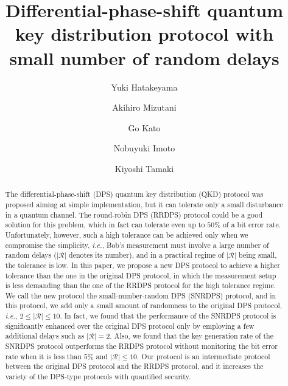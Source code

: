 \documentclass[twocolumn,superscriptaddress,pra,footinbib,notitlepage]{revtex4-1}
\newcommand{\1}{\mbox{1}\hspace{-0.25em}\mbox{l}}
\newcommand{\abs}[1]{\lvert#1\rvert}
\begin{document}
\title{
Differential-phase-shift quantum key distribution protocol with small number of random delays
}
\author{Yuki Hatakeyama}
\author{Akihiro Mizutani}
\author{Go Kato}
\author{Nobuyuki Imoto}
\author{Kiyoshi Tamaki}
\begin{abstract}

The differential-phase-shift (DPS) quantum key distribution (QKD) protocol was proposed aiming at simple implementation, but it can tolerate only a small disturbance in a quantum channel.
The round-robin DPS (RRDPS) protocol could be a good solution for this problem, which in fact can tolerate even up to $50\%$ of a bit error rate.
Unfortunately, however, such a high tolerance can be achieved only when we compromise the simplicity, \textit{i.e.}, Bob's measurement must involve a large number of random delays ($\abs{\mathcal{R}}$ denotes its number), and in a practical regime of $\abs{\mathcal{R}}$ being small, the tolerance is low.
In this paper, we propose a new DPS protocol to achieve a higher tolerance than the one in the original DPS protocol, in which the measurement setup is less demanding than the one of the RRDPS protocol for the high tolerance regime.
We call the new protocol the small-number-random DPS (SNRDPS) protocol, and in this protocol, we add only a small amount of randomness to the original DPS protocol, \textit{i.e.}, $2\leq\abs{\mathcal{R}}\leq10$.
In fact, we found that the performance of the SNRDPS protocol is significantly enhanced over the original DPS protocol only by employing a few additional delays such as $\abs{\mathcal{R}}=2$.
Also, we found that the key generation rate of the SNRDPS protocol outperforms the RRDPS protocol without monitoring the bit error rate when it is less than $5\%$ and $\abs{\mathcal{R}}\leq10$.
Our protocol is an intermediate protocol between the original DPS protocol and the RRDPS protocol, and it increases the variety of the DPS-type protocols with quantified security.

\end{abstract}
\maketitle
\end{document}

